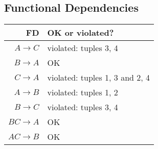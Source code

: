 \subsection{Functional Dependencies}

\begin{center}
\begin{tabular}{r  l }
  \hline
  FD & OK or violated? \\
   \hline
   $A \rightarrow C$ & violated: tuples 3, 4 \\
   $B \rightarrow A$ & OK \\
   $C \rightarrow A$ & violated: tuples 1, 3 and 2, 4 \\
   $A \rightarrow B$ & violated: tuples 1, 2 \\
   $B \rightarrow C$ & violated: tuples 3, 4 \\
   $BC \rightarrow A$ & OK \\
   $AC \rightarrow B$ & OK \\
   \hline
\end{tabular}
\end{center}
